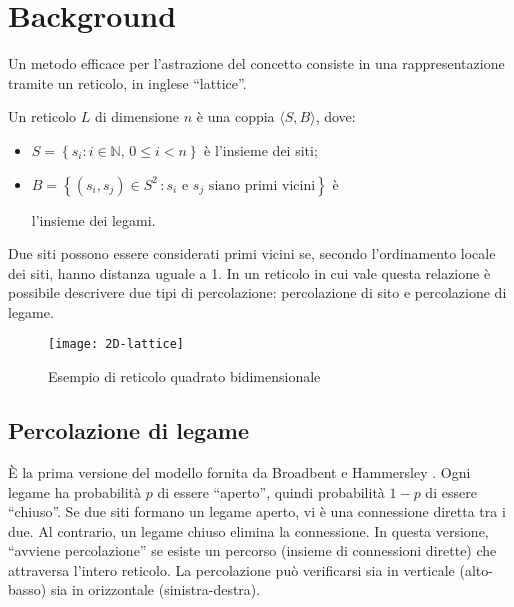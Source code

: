 \section{Background}
\label{sec:background}

Un metodo efficace per l'astrazione del concetto consiste 
in una rappresentazione tramite un reticolo, in inglese ``lattice''.


\begin{definition}[Reticolo]
    Un reticolo $L$ di dimensione $n$ è una coppia $\langle S, B \rangle$, dove:
    \begin{itemize}
        \item $S = \left\{ s_i : i \in \mathbb{N} , \, 0 \leq i < n \right\}$ è l'insieme dei siti;
        \item $B = \left\{ (s_i, s_j) \in S^2 \, : \text{$s_i$ e $s_j$ siano primi vicini} \right\}$ è 
        
        l'insieme dei legami.
    \end{itemize}
\end{definition}
Due siti possono essere considerati primi vicini se, secondo l'ordinamento locale dei siti, hanno 
distanza uguale a 1.
In un reticolo in cui vale questa relazione è possibile descrivere due tipi di percolazione: 
percolazione di sito e percolazione di legame.

\begin{figure}
    \centering
    \texttt{[image: 2D-lattice]}
    \caption{Esempio di reticolo quadrato bidimensionale}
    \label{fig:ex-lattice}
\end{figure}

\subsection*{Percolazione di legame}
È la prima versione del modello fornita da Broadbent e Hammersley \cite{broadbent}.
Ogni legame ha probabilità $p$ di essere ``aperto'', quindi
probabilità $1-p$ di essere ``chiuso''. Se due siti formano un legame aperto, vi è una
connessione diretta tra i due. Al contrario, un legame chiuso elimina la connessione.
In questa versione, ``avviene percolazione'' se esiste un percorso (insieme di connessioni dirette) 
che attraversa l'intero reticolo. La percolazione può verificarsi 
sia in verticale (alto-basso) sia in orizzontale (sinistra-destra).

